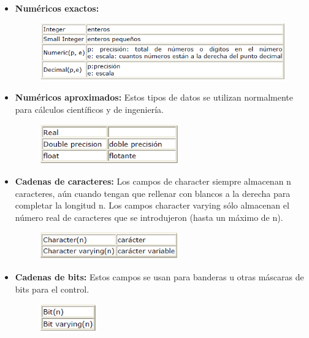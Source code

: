 \documentclass[preprint,12pt]{elsarticle}
\begin{document}
\begin{itemize}
	\item \textbf{Numéricos exactos:}
	\begin{figure}[htb]
		\begin{center}
			\includegraphics[width=11.5cm]{./IMAGENES/num_exactos}
		\end{center}
	\end{figure}
	
	
	\item \textbf{Numéricos aproximados:} Estos tipos de datos se utilizan normalmente para cálculos científicos y de ingeniería.
	
	\begin{figure}[htb]
		\begin{center}
			\includegraphics[width=6cm]{./IMAGENES/num_aprox}
		\end{center}
	\end{figure}
	
	
	\item \textbf{Cadenas de caracteres:} Los campos de character siempre almacenan n caracteres, aún cuando tengan que rellenar con blancos a la derecha para completar la longitud n. Los campos character varying sólo almacenan el número real de caracteres que se introdujeron (hasta un máximo de n). \\
	\begin{figure}[htb]
		\begin{center}
			\includegraphics[width=6cm]{./IMAGENES/caracteres}
		\end{center}
	\end{figure}
	
	
	\item \textbf{Cadenas de bits:} Estos campos se usan para banderas u otras máscaras de bits para el control.\\
	\begin{figure}[htb]
		\begin{center}
			\includegraphics[width=2.5cm]{./IMAGENES/bits}
		\end{center}
	\end{figure}
	

\end{itemize}
\end{document}
